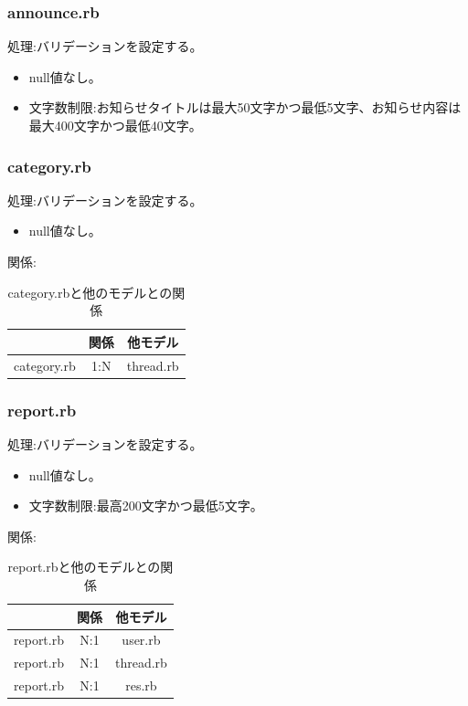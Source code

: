 \documentclass[a4j]{jarticle}
\begin{document}
\subsubsection{announce.rb}
\noindent
処理:バリデーションを設定する。
\begin{itemize}
  \item null値なし。
  \item 文字数制限:お知らせタイトルは最大50文字かつ最低5文字、お知らせ内容は最大400文字かつ最低40文字。
\end{itemize}

\subsubsection{category.rb}
\noindent
処理:バリデーションを設定する。
\begin{itemize}
  \item null値なし。
\end{itemize}
関係:
\begin{table}[H]
  \centering
  \caption{category.rbと他のモデルとの関係}
  \begin{tabular}{|c|c|c|}\hline
    & 関係 & 他モデル\\ \hline \hline
    category.rb & 1:N & thread.rb \\ \hline
  \end{tabular}
\end{table}

\subsubsection{report.rb}
\noindent
処理:バリデーションを設定する。
\begin{itemize}
  \item null値なし。
  \item 文字数制限:最高200文字かつ最低5文字。
  \end{itemize}
関係:
\begin{table}[H]
  \centering
  \caption{report.rbと他のモデルとの関係}
  \begin{tabular}{|c|c|c|}\hline
    & 関係 & 他モデル\\ \hline \hline
    report.rb & N:1 & user.rb \\ \hline
    report.rb & N:1 & thread.rb \\ \hline
    report.rb & N:1 & res.rb \\ \hline
  \end{tabular}
\end{table}
\end{document}
